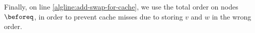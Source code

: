 Finally, on line \ref{algline:add-swap-for-cache}, we use the total order on nodes $\beforeq$,
in order to prevent cache misses due to storing $v$ and $w$ in the wrong order.




